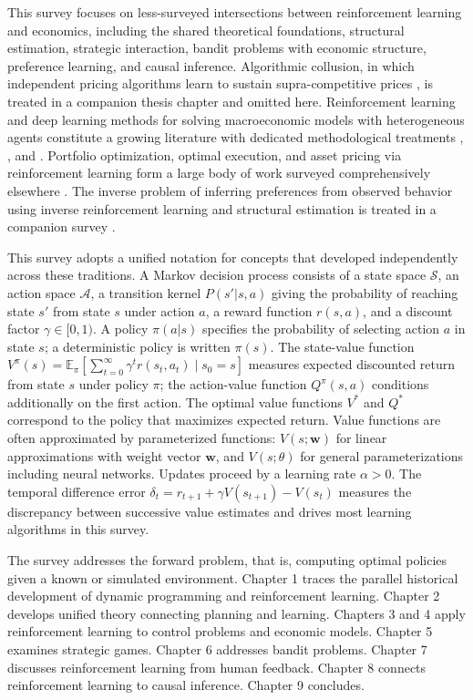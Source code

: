 This survey focuses on less-surveyed intersections between reinforcement learning and economics, including the shared theoretical foundations, structural estimation, strategic interaction, bandit problems with economic structure, preference learning, and causal inference. Algorithmic collusion, in which independent pricing algorithms learn to sustain supra-competitive prices \citep{Calvano2020}, is treated in a companion thesis chapter \citep{Rawat2026collusion} and omitted here. Reinforcement learning and deep learning methods for solving macroeconomic models with heterogeneous agents constitute a growing literature with dedicated methodological treatments \citep{AtashbarShi2022}, \citep{MaliarMaliarWinant2021}, and \citep{FernandezVillaverdeNunoPerla2024}. Portfolio optimization, optimal execution, and asset pricing via reinforcement learning form a large body of work surveyed comprehensively elsewhere \citep{HamblyXuYang2023}. The inverse problem of inferring preferences from observed behavior using inverse reinforcement learning and structural estimation is treated in a companion survey \citep{RustRawat2026}.

This survey adopts a unified notation for concepts that developed independently across these traditions. A Markov decision process consists of a state space $\mathcal{S}$, an action space $\mathcal{A}$, a transition kernel $P(s'|s,a)$ giving the probability of reaching state $s'$ from state $s$ under action $a$, a reward function $r(s,a)$, and a discount factor $\gamma \in [0,1)$. A policy $\pi(a|s)$ specifies the probability of selecting action $a$ in state $s$; a deterministic policy is written $\pi(s)$. The state-value function $V^\pi(s) = \mathbb{E}_\pi[\sum_{t=0}^\infty \gamma^t r(s_t, a_t) \mid s_0 = s]$ measures expected discounted return from state $s$ under policy $\pi$; the action-value function $Q^\pi(s,a)$ conditions additionally on the first action. The optimal value functions $V^*$ and $Q^*$ correspond to the policy that maximizes expected return. Value functions are often approximated by parameterized functions: $V(s; \mathbf{w})$ for linear approximations with weight vector $\mathbf{w}$, and $V(s; \theta)$ for general parameterizations including neural networks. Updates proceed by a learning rate $\alpha > 0$. The temporal difference error $\delta_t = r_{t+1} + \gamma V(s_{t+1}) - V(s_t)$ measures the discrepancy between successive value estimates and drives most learning algorithms in this survey.

The survey addresses the forward problem, that is, computing optimal policies given a known or simulated environment. Chapter 1 traces the parallel historical development of dynamic programming and reinforcement learning. Chapter 2 develops unified theory connecting planning and learning. Chapters 3 and 4 apply reinforcement learning to control problems and economic models. Chapter 5 examines strategic games. Chapter 6 addresses bandit problems. Chapter 7 discusses reinforcement learning from human feedback. Chapter 8 connects reinforcement learning to causal inference. Chapter 9 concludes.

